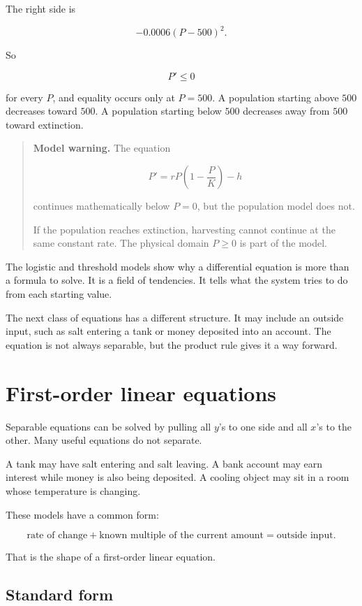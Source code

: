 The right side is

\[
-0.0006(P-500)^2.
\]

So

\[
P'\le0
\]

for every \(P\), and equality occurs only at \(P=500\).  A population starting above
\(500\) decreases toward \(500\).  A population starting below \(500\) decreases away
from \(500\) toward extinction.

\begin{quote}
\textbf{Model warning.}
The equation

\[
P'=rP\left(1-\frac{P}{K}\right)-h
\]

continues mathematically below \(P=0\), but the population model does not.

If the population reaches extinction, harvesting cannot continue at the same constant
rate.  The physical domain \(P\ge0\) is part of the model.
\end{quote}

The logistic and threshold models show why a differential equation is more than a
formula to solve.  It is a field of tendencies.  It tells what the system tries to do from
each starting value.

The next class of equations has a different structure.  It may include an outside input,
such as salt entering a tank or money deposited into an account.  The equation is not
always separable, but the product rule gives it a way forward.

\section{First-order linear equations}
\label{sec:first-order-linear-equations}

Separable equations can be solved by pulling all \(y\)'s to one side and all \(x\)'s to the
other.  Many useful equations do not separate.

A tank may have salt entering and salt leaving.  A bank account may earn interest while
money is also being deposited.  A cooling object may sit in a room whose temperature is
changing.

These models have a common form:

\[
\text{rate of change}
+
\text{known multiple of the current amount}
=
\text{outside input}.
\]

That is the shape of a first-order linear equation.

\subsection{Standard form}
\label{subsec:first-order-linear-standard-form}

